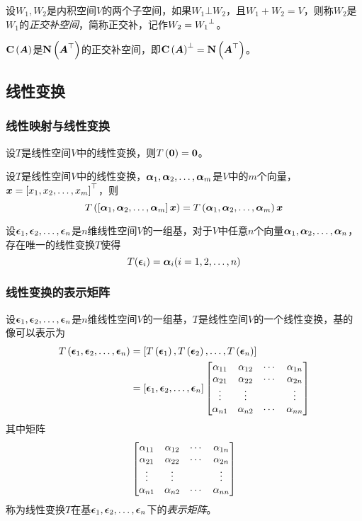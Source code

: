 \documentclass{ctexart}
\begin{document}
\begin{definition}[正交补空间]
    设\(W_1,W_2\)是内积空间\(V\)的两个子空间，如果\(W_1\bot W_2\)，且\(W_1+W_2=V\)，则称\(W_2\)是\(W_1\)的\emph{正交补空间}，简称正交补，记作\(W_2=\ortcom{W_1}\)。
\end{definition}

\begin{infer}
    \(\colsp{\mata}\)是\(\nullsp{\mata^\top}\)的正交补空间，即\(\ortcom{\colsp{\mata}}=\nullsp{\mata^\top}\)。
\end{infer}

\subsection{线性变换}

\subsubsection*{线性映射与线性变换}

\begin{property}
    设\(T\)是线性空间\(V\)中的线性变换，则\(T\mypar{\veczero}=\veczero\)。
\end{property}

\begin{property}
    设\(T\)是线性空间\(V\)中的线性变换，\(\enums{\vecal}{m}\)是\(V\)中的\(m\)个向量，\(\vecx=\mat{\enums{x}{m}}^\top\)，则
    \begin{equation*}
        T\mypar{\mat{\enums{\vecal}{m}}\vecx}=T\mypar{\enums{\vecal}{m}}\vecx
    \end{equation*}
\end{property}

\begin{theorem}
    设\(\enums{\veceps}{n}\)是\(n\)维线性空间\(V\)的一组基，对于\(V\)中任意\(n\)个向量\(\enums{\vecal}{n}\)，存在唯一的线性变换\(T\)使得
    \begin{equation*}
        T(\veceps_i)=\vecal_i(i=1,2,\dots,n)
    \end{equation*}
\end{theorem}

\subsubsection*{线性变换的表示矩阵}

\begin{definition}[表示矩阵]
    设\(\enums{\veceps}{n}\)是\(n\)维线性空间\(V\)的一组基，\(T\)是线性空间\(V\)的一个线性变换，基的像可以表示为
    \begin{align*}
        T\mypar{\enums{\veceps}{n}} & =\mat{T\mypar{\veceps_1},T\mypar{\veceps_2},\dots,T\mypar{\veceps_n}} \\
                                    & =\mat{\enums{\veceps}{n}}\sqmat{bmatrix}{\alpha}{n}
    \end{align*}
    其中矩阵
    \begin{equation*}
        \sqmat{bmatrix}{\alpha}{n}
    \end{equation*}
    称为线性变换\(T\)在基\(\enums{\veceps}{n}\)下的\emph{表示矩阵}。
\end{definition}
\end{document}
